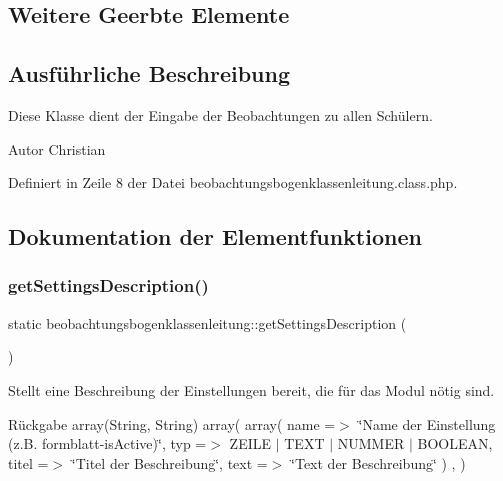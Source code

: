 \subsection*{Weitere Geerbte Elemente}


\subsection{Ausführliche Beschreibung}
Diese Klasse dient der Eingabe der Beobachtungen zu allen Schülern. \begin{DoxyAuthor}{Autor}
Christian 
\end{DoxyAuthor}


Definiert in Zeile 8 der Datei beobachtungsbogenklassenleitung.\+class.\+php.



\subsection{Dokumentation der Elementfunktionen}
\mbox{\label{classbeobachtungsbogenklassenleitung_a25f634bb0493b0d8a6766d1463e5e53b}} 
\subsubsection{\texorpdfstring{get\+Settings\+Description()}{getSettingsDescription()}}
{\footnotesize\ttfamily static beobachtungsbogenklassenleitung\+::get\+Settings\+Description (\begin{DoxyParamCaption}{ }\end{DoxyParamCaption})\hspace{0.3cm}{\ttfamily [static]}}

Stellt eine Beschreibung der Einstellungen bereit, die für das Modul nötig sind. \begin{DoxyReturn}{Rückgabe}
array(\+String, String) array( array( \textquotesingle{}name\textquotesingle{} =$>$ \char`\"{}\+Name der Einstellung (z.\+B. formblatt-\/is\+Active)\char`\"{}, \textquotesingle{}typ\textquotesingle{} =$>$ Z\+E\+I\+LE $\vert$ T\+E\+XT $\vert$ N\+U\+M\+M\+ER $\vert$ B\+O\+O\+L\+E\+AN, \textquotesingle{}titel\textquotesingle{} =$>$ \char`\"{}\+Titel der Beschreibung\char`\"{}, \textquotesingle{}text\textquotesingle{} =$>$ \char`\"{}\+Text der Beschreibung\char`\"{} ) , ) 
\end{DoxyReturn}


